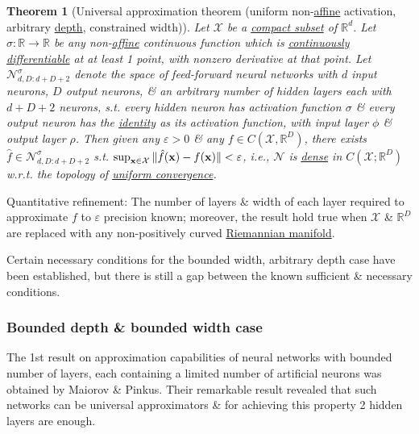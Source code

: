 \documentclass{article}
\newtheorem{theorem}{Theorem}
\begin{document}
\begin{theorem}[Universal approximation theorem (uniform non-\href{https://en.wikipedia.org/wiki/Affine_transformation}{affine} activation, arbitrary \href{https://en.wikipedia.org/wiki/Deep_learning}{depth}, constrained width)]
	Let $\mathcal{X}$ be a \href{https://en.wikipedia.org/wiki/Compact_set}{compact subset} of $\mathbb{R}^d$. Let $\sigma:\mathbb{R}\to\mathbb{R}$ be any non-\href{https://en.wikipedia.org/wiki/Affine_transformation}{affine} continuous function which is \href{https://en.wikipedia.org/wiki/Differentiable_function#Differentiability_classes}{continuously differentiable} at at least 1 point, with nonzero derivative at that point. Let $\mathcal{N}_{d,D:d + D + 2}^\sigma$ denote the space of feed-forward neural networks with $d$ input neurons, $D$ output neurons, \& an arbitrary number of hidden layers each with $d + D + 2$ neurons, s.t. every hidden neuron has activation function $\sigma$ \& every output neuron has the \href{https://en.wikipedia.org/wiki/Identity_function}{identity} as its activation function, with input layer $\phi$ \& output layer $\rho$. Then given any $\varepsilon > 0$ \& any $f\in C(\mathcal{X},\mathbb{R}^D)$, there exists $\hat{f}\in\mathcal{N}_{d,D:d + D + 2}^\sigma$ s.t. $\sup_{{\bf x}\in\mathcal{X}} \|\hat{f}({\bf x}) - f({\bf x})\| < \varepsilon$, i.e., $\mathcal{N}$ is \href{https://en.wikipedia.org/wiki/Dense_set}{dense} in $C(\mathcal{X};\mathbb{R}^D)$ w.r.t. the topology of \href{https://en.wikipedia.org/wiki/Uniform_convergence}{uniform convergence}.
\end{theorem}
{\sf Quantitative refinement}: The number of layers \& width of each layer required to approximate $f$ to $\varepsilon$ precision known; moreover, the result hold true when $\mathcal{X}$ \& $\mathbb{R}^D$ are replaced with any non-positively curved \href{https://en.wikipedia.org/wiki/Riemannian_manifold}{Riemannian manifold}.

Certain necessary conditions for the bounded width, arbitrary depth case have been established, but there is still a gap between the known sufficient \& necessary conditions.

\subsubsection{Bounded depth \& bounded width case}
The 1st result on approximation capabilities of neural networks with bounded number of layers, each containing a limited number of artificial neurons was obtained by Maiorov \& Pinkus. Their remarkable result revealed that such networks can be universal approximators \& for achieving this property 2 hidden layers are enough.
\end{document}
